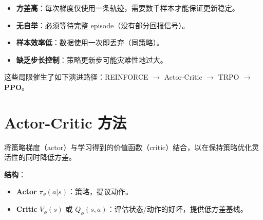 \begin{warningbox}
\begin{itemize}
  \item \textbf{方差高}：每次梯度仅使用一条轨迹，需要数千样本才能保证更新稳定。
  \item \textbf{无自举}：必须等待完整 episode（没有部分回报信号）。
  \item \textbf{样本效率低}：数据使用一次即丢弃（同策略）。
  \item \textbf{缺乏步长控制}：策略更新步可能灾难性地过大。
\end{itemize}

这些局限催生了如下演进路径：REINFORCE $\to$ Actor-Critic $\to$ TRPO $\to$ \textbf{PPO}。
\end{warningbox}

\section{Actor-Critic 方法}
\label{actor-critic-methods}

将策略梯度（actor）与学习得到的价值函数（critic）结合，以在保持策略优化灵活性的同时降低方差。

\textbf{结构}：

\begin{itemize}
  \item \textbf{Actor} $\pi_\theta(a|s)$：策略，提议动作。
  \item \textbf{Critic} $V_\phi(s)$ 或 $Q_\phi(s,a)$：评估状态/动作的好坏，提供低方差基线。
\end{itemize}

